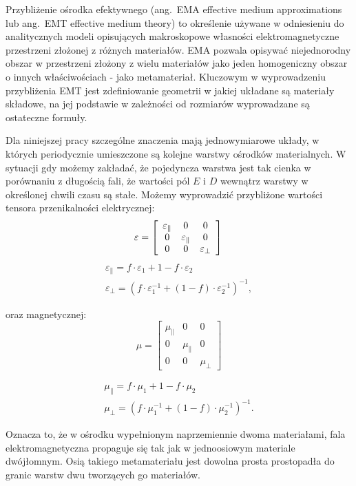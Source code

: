 \label{subart:effmedium}
Przybliżenie ośrodka efektywnego (ang.~EMA effective medium approximations lub ang.~EMT effective medium theory) to określenie używane w odniesieniu do analitycznych modeli opisujących makroskopowe własności elektromagnetyczne przestrzeni złożonej z różnych materiałów. EMA pozwala opisywać niejednorodny obszar w przestrzeni złożony z wielu materiałów jako jeden homogeniczny obszar o innych właściwościach - jako metamateriał. Kluczowym w wyprowadzeniu przybliżenia EMT jest zdefiniowanie geometrii w jakiej układane są materiały składowe, na jej podstawie w zależności od rozmiarów wyprowadzane są ostateczne formuły.

Dla niniejszej pracy szczególne znaczenia mają jednowymiarowe układy, w których periodycznie umieszczone są kolejne warstwy ośrodków materialnych. W sytuacji gdy możemy zakładać, że pojedyncza warstwa jest tak cienka w porównaniu z długością fali, że wartości pól $E$ i $D$ wewnątrz warstwy w określonej chwili czasu są stałe. Możemy wyprowadzić przybliżone wartości tensora przenikalności elektrycznej:
\[ \varepsilon= \left[ \begin{array}{ccc}
	\varepsilon_{\parallel} & 0 & 0 \\
	0 & \varepsilon_{\parallel} & 0 \\
	0 & 0 &  \varepsilon_{\perp} \end{array} \right] 
\\
\]
\begin{equation}
	\begin{gathered}
		\varepsilon_{\parallel}=f\cdot{\varepsilon_1}+{1-f}\cdot \varepsilon_2 \\ 
		\varepsilon_{\perp}=\left(f\cdot{\varepsilon_1^{-1}}+(1-f)\cdot \varepsilon_2^{-1}\right)^{-1},
	\end{gathered}
\label{eq:effmedium}
\end{equation}


oraz magnetycznej:
\[ \mu= \left[ \begin{array}{ccc}
					\mu_{\parallel} & 0 & 0 \\
					0 & \mu_{\parallel} & 0 \\
					0 & 0 &  \mu_{\perp} \end{array} \right]
\]

\begin{equation}
	\begin{gathered}
		\mu_{\parallel}=f\cdot{\mu_1}+{1-f}\cdot \mu_2 \\
		\mu_{\perp}=\left(f\cdot{\mu_1^{-1}}+(1-f)\cdot \mu_2^{-1}\right)^{-1}.
	\end{gathered}
\label{eq:effmedium-mu}
\end{equation}

Oznacza to, że w ośrodku wypełnionym naprzemiennie dwoma materiałami, fala elektromagnetyczna propaguje się tak jak w jednoosiowym materiale dwójłomnym. Osią takiego metamateriału jest dowolna prosta prostopadła do granic warstw dwu tworzących go materiałów.







